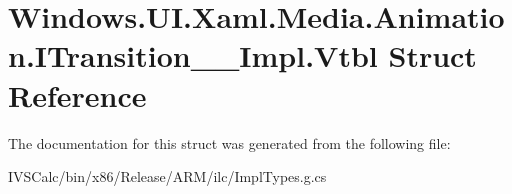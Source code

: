 \hypertarget{struct_windows_1_1_u_i_1_1_xaml_1_1_media_1_1_animation_1_1_i_transition_____impl_1_1_vtbl}{}\section{Windows.\+U\+I.\+Xaml.\+Media.\+Animation.\+I\+Transition\+\_\+\+\_\+\+Impl.\+Vtbl Struct Reference}
\label{struct_windows_1_1_u_i_1_1_xaml_1_1_media_1_1_animation_1_1_i_transition_____impl_1_1_vtbl}


The documentation for this struct was generated from the following file\+:\begin{DoxyCompactItemize}
\item 
I\+V\+S\+Calc/bin/x86/\+Release/\+A\+R\+M/ilc/Impl\+Types.\+g.\+cs\end{DoxyCompactItemize}
